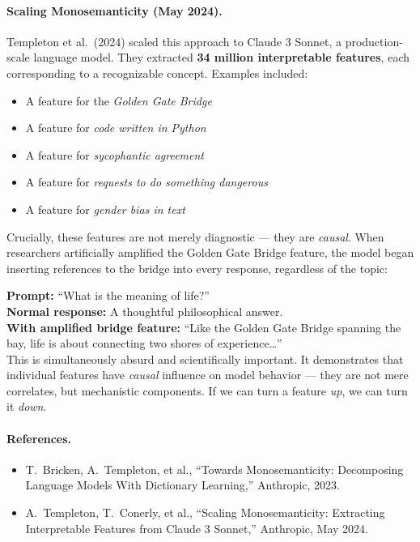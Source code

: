 \documentclass[11pt, a4paper]{article}
\theoremstyle{definition}
\theoremstyle{plain}
\begin{document}
\paragraph{Scaling Monosemanticity (May 2024).}
Templeton et al.\ (2024) scaled this approach to Claude 3 Sonnet, a
production-scale language model.  They extracted \textbf{34 million
interpretable features}, each corresponding to a recognizable concept.
Examples included:
\begin{itemize}[leftmargin=2em]
  \item A feature for the \emph{Golden Gate Bridge}
  \item A feature for \emph{code written in Python}
  \item A feature for \emph{sycophantic agreement}
  \item A feature for \emph{requests to do something dangerous}
  \item A feature for \emph{gender bias in text}
\end{itemize}

Crucially, these features are not merely diagnostic --- they are
\emph{causal}.  When researchers artificially amplified the Golden Gate
Bridge feature, the model began inserting references to the bridge into
every response, regardless of the topic:

\begin{examplebox}[title={The Golden Gate Bridge Experiment}]
\textbf{Prompt:} ``What is the meaning of life?''\\[4pt]
\textbf{Normal response:} A thoughtful philosophical answer.\\[4pt]
\textbf{With amplified bridge feature:} ``Like the Golden Gate Bridge
spanning the bay, life is about connecting two shores of experience\ldots''
\\[6pt]
This is simultaneously absurd and scientifically important.  It
demonstrates that individual features have \emph{causal} influence on
model behavior --- they are not mere correlates, but mechanistic
components.  If we can turn a feature \emph{up}, we can turn it
\emph{down}.
\end{examplebox}

\paragraph{References.}
\begin{itemize}[leftmargin=2em, itemsep=2pt]
  \item T.\ Bricken, A.\ Templeton, et al., ``Towards Monosemanticity:
    Decomposing Language Models With Dictionary Learning,'' Anthropic, 2023.
  \item A.\ Templeton, T.\ Conerly, et al., ``Scaling Monosemanticity:
    Extracting Interpretable Features from Claude 3 Sonnet,'' Anthropic,
    May 2024.
\end{itemize}
\end{document}
